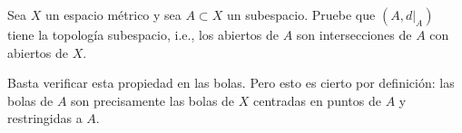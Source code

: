\begin{exercise}
Sea $X$ un espacio métrico y sea $A \subset X$ un subespacio. Pruebe que $(A, d|_A)$ tiene la topología subespacio, i.e., los abiertos de $A$ son intersecciones de $A$ con abiertos de $X$.
\end{exercise}

\begin{solution}
Basta verificar esta propiedad en las bolas. Pero esto es cierto por definición: las bolas de $A$ son precisamente las bolas de $X$ centradas en puntos de $A$ y restringidas a $A$.
\end{solution}
